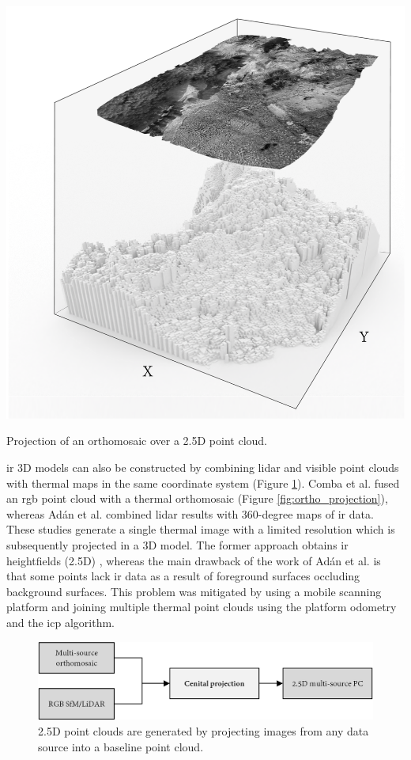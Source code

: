 \begin{marginfigure}[-3cm]
	\includegraphics{figs/context/orthomosaic_projection.png}
	\caption{Projection of an orthomosaic over a 2.5D point cloud.}
	\label{fig:ortho_projection}
\end{marginfigure}
\acrshort{ir} 3D models can also be constructed by combining \acrshort{lidar} and visible point clouds with thermal maps in the same coordinate system (Figure \ref{fig:fusion_data_02}). Comba et al. \cite{comba_2d_2019} fused an \acrshort{rgb} point cloud with a thermal orthomosaic (Figure \ref{fig:ortho_projection}), whereas Adán et al. \cite{adan_towards_2020} combined \acrshort{lidar} results with 360-degree maps of \acrshort{ir} data. These studies generate a single thermal image with a limited resolution which is subsequently projected in a 3D model. The former approach obtains \acrshort{ir} heightfields (2.5D) \cite{juszczyk_wound_2021}, whereas the main drawback of the work of Adán et al. \cite{adan_towards_2020} is that some points lack \acrshort{ir} data as a result of foreground surfaces occluding background surfaces. This problem was mitigated by using a mobile scanning platform and joining multiple thermal point clouds using the platform odometry and the \acrshort{icp} algorithm. 

\begin{figure}[ht]
	\includegraphics[width=\linewidth]{figs/context/fusion_02.png}
	\caption{2.5D point clouds are generated by projecting images from any data source into a baseline point cloud.}
    \label{fig:fusion_data_02}
\end{figure}

